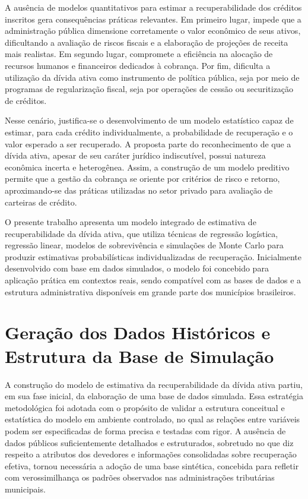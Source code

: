 \documentclass[a4paper,12pt]{article}
\begin{document}
A ausência de modelos quantitativos para estimar a recuperabilidade dos créditos inscritos gera consequências práticas relevantes. Em primeiro lugar, impede que a administração pública dimensione corretamente o valor econômico de seus ativos, dificultando a avaliação de riscos fiscais e a elaboração de projeções de receita mais realistas. Em segundo lugar, compromete a eficiência na alocação de recursos humanos e financeiros dedicados à cobrança. Por fim, dificulta a utilização da dívida ativa como instrumento de política pública, seja por meio de programas de regularização fiscal, seja por operações de cessão ou securitização de créditos.

Nesse cenário, justifica-se o desenvolvimento de um modelo estatístico capaz de estimar, para cada crédito individualmente, a probabilidade de recuperação e o valor esperado a ser recuperado. A proposta parte do reconhecimento de que a dívida ativa, apesar de seu caráter jurídico indiscutível, possui natureza econômica incerta e heterogênea. Assim, a construção de um modelo preditivo permite que a gestão da cobrança se oriente por critérios de risco e retorno, aproximando-se das práticas utilizadas no setor privado para avaliação de carteiras de crédito.

O presente trabalho apresenta um modelo integrado de estimativa de recuperabilidade da dívida ativa, que utiliza técnicas de regressão logística, regressão linear, modelos de sobrevivência e simulações de Monte Carlo para produzir estimativas probabilísticas individualizadas de recuperação. Inicialmente desenvolvido com base em dados simulados, o modelo foi concebido para aplicação prática em contextos reais, sendo compatível com as bases de dados e a estrutura administrativa disponíveis em grande parte dos municípios brasileiros. 

\section{Geração dos Dados Históricos e Estrutura da Base de Simulação}

A construção do modelo de estimativa da recuperabilidade da dívida ativa partiu, em sua fase inicial, da elaboração de uma base de dados simulada. Essa estratégia metodológica foi adotada com o propósito de validar a estrutura conceitual e estatística do modelo em ambiente controlado, no qual as relações entre variáveis podem ser especificadas de forma precisa e testadas com rigor. A ausência de dados públicos suficientemente detalhados e estruturados, sobretudo no que diz respeito a atributos dos devedores e informações consolidadas sobre recuperação efetiva, tornou necessária a adoção de uma base sintética, concebida para refletir com verossimilhança os padrões observados nas administrações tributárias municipais.
\end{document}
